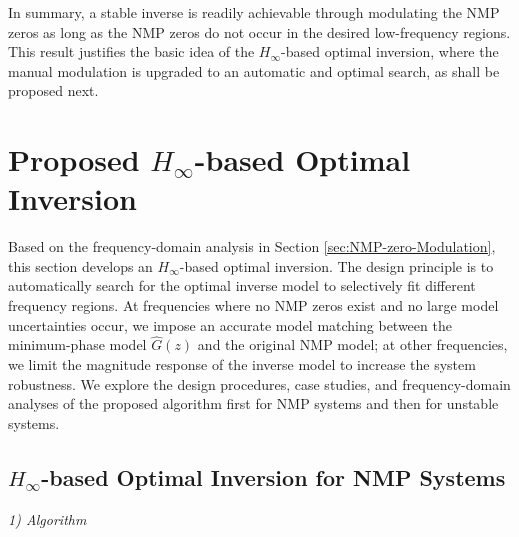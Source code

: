 \documentclass [11pt, proquest] {uwthesis}[2020/02/24]
\begin{document}
In summary, a stable inverse is readily achievable through modulating
the NMP zeros as long as the NMP zeros do not occur in the desired
low-frequency regions. This result justifies the basic idea of the
$H_{\infty}$-based optimal inversion, where the manual modulation
is upgraded to an automatic and optimal search, as shall be proposed
next.

\section{\label{sec:-based-Optimal-Design}Proposed $H_{\infty}$-based Optimal
Inversion}

Based on the frequency-domain analysis in Section \ref{sec:NMP-zero-Modulation},
this section develops an $H_{\infty}$-based optimal inversion. The
design principle is to automatically search for the optimal inverse
model to selectively fit different frequency regions. At frequencies
where no NMP zeros exist and no large model uncertainties occur, we
impose an accurate model matching between the minimum-phase model
$\hat{G}(z)$ and the original NMP model; at other frequencies,
we limit the magnitude response of the inverse model to increase the
system robustness. We explore the design procedures, case studies,
and frequency-domain analyses of the proposed algorithm first for
NMP systems and then for unstable systems. 

\subsection{\label{subsec:-based-optimal-inversion}$H_{\infty}$-based Optimal
Inversion for NMP Systems}

\noindent \emph{1) Algorithm}
\end{document}
